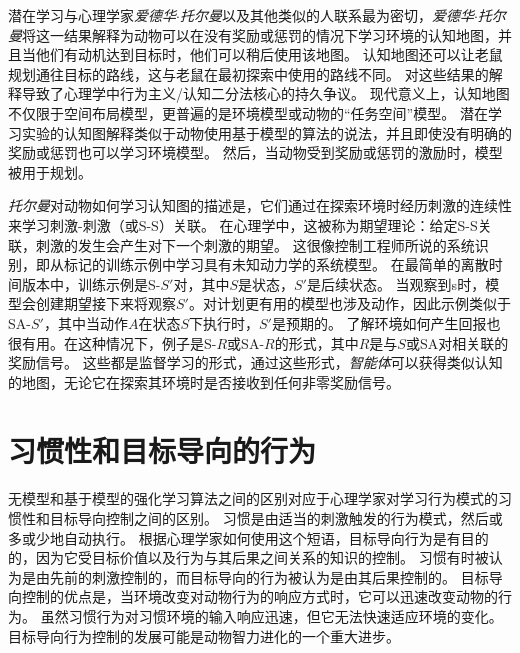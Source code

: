 潜在学习与心理学家\textit{爱德华$\cdot$托尔曼}以及其他类似的人联系最为密切，\textit{爱德华$\cdot$托尔曼}将这一结果解释为动物可以在没有奖励或惩罚的情况下学习环境的认知地图，并且当他们有动机达到目标时，他们可以稍后使用该地图\cite{tolman1948cognitive}。
认知地图还可以让老鼠规划通往目标的路线，这与老鼠在最初探索中使用的路线不同。
对这些结果的解释导致了心理学中行为主义/认知二分法核心的持久争议。
现代意义上，认知地图不仅限于空间布局模型，更普遍的是环境模型或动物的“任务空间”模型\cite{wilson2014orbitofrontal}。
潜在学习实验的认知图解释类似于动物使用基于模型的算法的说法，并且即使没有明确的奖励或惩罚也可以学习环境模型。
然后，当动物受到奖励或惩罚的激励时，模型被用于规划。


\textit{托尔曼}对动物如何学习认知图的描述是，它们通过在探索环境时经历刺激的连续性来学习刺激-刺激（或S-S）关联。
在心理学中，这被称为期望理论：给定S-S关联，刺激的发生会产生对下一个刺激的期望。
这很像控制工程师所说的系统识别，即从标记的训练示例中学习具有未知动力学的系统模型。
在最简单的离散时间版本中，训练示例是S-$S'$对，其中$S$是状态，$S'$是后续状态。
当观察到s时，模型会创建期望接下来将观察$S'$。对计划更有用的模型也涉及动作，因此示例类似于SA-$S'$，其中当动作$ A $在状态$ S $下执行时，$ S' $是预期的。
了解环境如何产生回报也很有用。在这种情况下，例子是S-$ R $或SA-$ R $的形式，其中$ R $是与$ S $或SA对相关联的奖励信号。
这些都是监督学习的形式，通过这些形式，\textit{智能体}可以获得类似认知的地图，无论它在探索其环境时是否接收到任何非零奖励信号。


\section{习惯性和目标导向的行为} \label{sec:habitual_behavior}

无模型和基于模型的强化学习算法之间的区别对应于心理学家对学习行为模式的习惯性和目标导向控制之间的区别。
习惯是由适当的刺激触发的行为模式，然后或多或少地自动执行。
根据心理学家如何使用这个短语，目标导向行为是有目的的，因为它受目标价值以及行为与其后果之间关系的知识的控制。
习惯有时被认为是由先前的刺激控制的，而目标导向的行为被认为是由其后果控制的\cite{dickinson1980contemporary,dickinson1985actions}。
目标导向控制的优点是，当环境改变对动物行为的响应方式时，它可以迅速改变动物的行为。
虽然习惯行为对习惯环境的输入响应迅速，但它无法快速适应环境的变化。
目标导向行为控制的发展可能是动物智力进化的一个重大进步。


